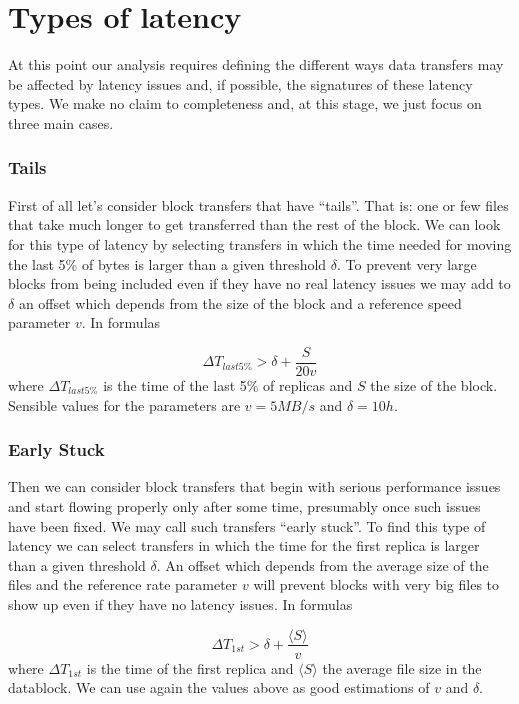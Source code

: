 \section{Types of latency}
\label{sec:types}

At this point our analysis requires defining the different ways data
transfers may be affected by latency issues and, if possible, the
signatures of these latency types.  We make no claim to completeness
and, at this stage, we just focus on three main cases.

\subsubsection*{Tails}
First of all let's consider block transfers that have ``tails''. That
is: one or few files that take much longer to get transferred than the
rest of the block. We can look for this type of latency by selecting
transfers in which the time needed for moving the last 5\% of bytes is
larger than a given threshold $\delta$.  To prevent very large blocks
from being included even if they have no real latency issues we may
add to $\delta$ an offset which depends from the size of the block and
a reference speed parameter $v$.  In formulas

\begin{equation}
{\Delta}T_{last 5\%} > \delta + \frac{S}{20 v}
\label{eq:late-stuck}
\end{equation}
where ${\Delta}T_{last 5\%}$ is the time of the last 5\% of replicas and
$S$ the size of the block. Sensible values for the parameters are
$v=5MB/s$ and $\delta=10h$.

\subsubsection*{Early Stuck}
Then we can consider block transfers that begin with serious
performance issues and start flowing properly only after some time,
presumably once such issues have been fixed. We may call such
transfers ``early stuck''.  To find this type of latency we can select
transfers in which the time for the first replica is larger than a
given threshold $\delta$.  An offset which depends from the average
size of the files and the reference rate parameter $v$ will prevent
blocks with very big files to show up even if they have no latency
issues. In formulas

\begin{equation}
{\Delta}T_{1st} > \delta + \frac{\langle S \rangle}{v}
\label{eq:early-stuck}
\end{equation}
where ${\Delta}T_{1st}$ is the time of the first replica and $\langle
S \rangle$ the average file size in the datablock. We can use again
the values above as good estimations of $v$ and $\delta$.

